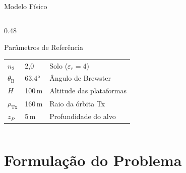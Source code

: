 \documentclass[aspectratio=169, 10pt]{beamer}
\newcommand{\Tx}{\mathrm{Tx}}
\newcommand{\thetaB}{\theta_{\mathrm{B}}}
\begin{document}
\begin{frame}{Modelo Físico}
\begin{columns}[T]
\begin{column}{0.48\textwidth}
\begin{block}{Parâmetros de Referência}
\begin{tabular}{@{}lll@{}}
          $n_2$        & 2{,}0    & Solo ($\varepsilon_r=4$) \\
          $\thetaB$    & 63{,}4°  & Ângulo de Brewster \\
          $H$          & 100\,m   & Altitude das plataformas \\
          $\rho_{\Tx}$ & 160\,m   & Raio da órbita Tx \\
          $z_P$        & 5\,m     & Profundidade do alvo \\
          \bottomrule
        \end{tabular}
      \end{block}
    \end{column}
  \end{columns}
\end{frame}

\section{Formulação do Problema}
\end{document}
